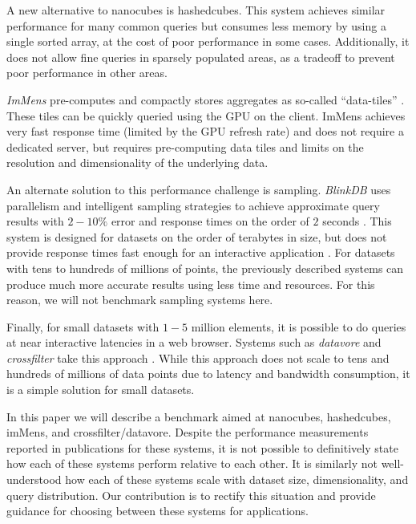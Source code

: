 \documentclass[journal]{vgtc}                %
\begin{document}
{A new alternative to nanocubes is hashedcubes. This system
achieves similar performance for many common queries but consumes less memory
by using a single sorted array, at the cost of poor performance in some cases.
Additionally, it does not allow fine queries in sparsely populated areas, as a
tradeoff to prevent poor performance in other areas.

\textit{ImMens} pre-computes and compactly stores aggregates as so-called
``data-tiles'' \cite{2013-immens}. These tiles can be quickly queried using the
GPU on the client.  ImMens achieves very fast response time (limited by the GPU
refresh rate) and does not require a dedicated server, but requires
pre-computing data tiles and limits on the resolution and dimensionality of the
underlying data.

An alternate solution to this performance challenge is sampling.
\textit{BlinkDB} uses parallelism and intelligent sampling strategies to
achieve approximate query results with $2-10\%$ error and response times on the
order of $2$ seconds \cite{blinkdb}. This system is designed for datasets on
the order of terabytes in size, but does not provide response times fast enough
for an interactive application . For datasets with tens to hundreds of millions of
points, the previously described systems can produce much more accurate results
using less time and resources. For this reason, we will not benchmark sampling
systems here. 

Finally, for small datasets with $1-5$ million elements, it is possible to do
queries at near interactive latencies in a web browser. Systems such as
\textit{datavore} and \textit{crossfilter} take this approach
\cite{crossfilter,datavore}. While this approach does not scale to tens and
hundreds of millions of data points due to latency and bandwidth consumption,
it is a simple solution for small datasets. 

In this paper we will describe a benchmark aimed at nanocubes, hashedcubes,
imMens, and crossfilter/datavore. Despite the performance measurements reported
in publications for these systems, it is not possible to definitively state how
each of these systems perform relative to each other. It is similarly not
well-understood how each of these systems scale with dataset size,
dimensionality, and query distribution. Our contribution is to rectify this
situation and provide guidance for choosing between these systems for
applications.

}
\end{document}
